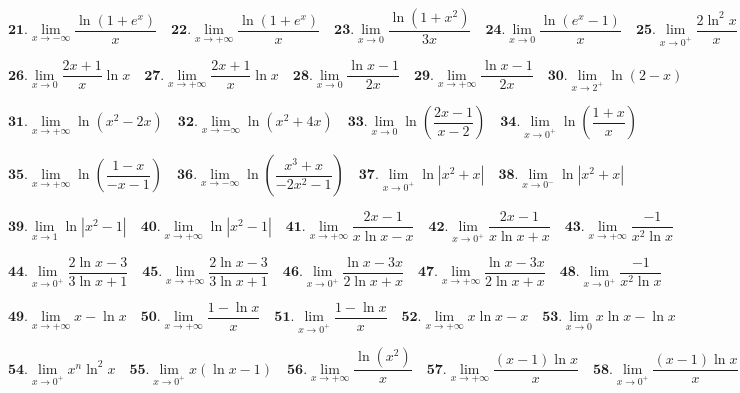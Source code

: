 \documentclass[12pt]{article}
\begin{document}
\[ 
\textbf{21.} \lim\limits_{x \to -\infty} \frac{\ln(1 + e^x)}{x} \quad
\textbf{22.} \lim\limits_{x \to +\infty} \frac{\ln(1 + e^x)}{x}  \quad
\textbf{23.} \lim\limits_{x \to 0} \frac{\ln(1 + x^2)}{3x} \quad
\textbf{24.} \lim\limits_{x \to 0} \frac{\ln(e^x - 1)}{x} \quad
\textbf{25.} \lim\limits_{x \to 0^+} \frac{2\ln^2 x}{x}
\] 

\[ 
\textbf{26.} \lim\limits_{x \to 0} \frac{2x + 1}{x} \ln x \quad
\textbf{27.} \lim\limits_{x \to +\infty} \frac{2x + 1}{x} \ln x  \quad
\textbf{28.} \lim\limits_{x \to 0} \frac{\ln x - 1}{2x} \quad
\textbf{29.} \lim\limits_{x \to +\infty} \frac{\ln x - 1}{2x} \quad
\textbf{30.} \lim\limits_{x \to 2^+} \ln(2 - x)
\]

\[ 
\textbf{31.} \lim\limits_{x \to +\infty} \ln(x^2 - 2x) \quad
\textbf{32.} \lim\limits_{x \to -\infty} \ln(x^2 + 4x) \quad
\textbf{33.} \lim\limits_{x \to 0} \ln\left(\frac{2x - 1}{x - 2}\right) \quad
\textbf{34.} \lim\limits_{x \to 0^+} \ln\left(\frac{1 + x}{x}\right)
\]

\[ 
\textbf{35.} \lim\limits_{x \to +\infty} \ln\left(\frac{1 - x}{-x - 1}\right) \quad
\textbf{36.} \lim\limits_{x \to -\infty} \ln\left(\frac{x^3 + x}{-2x^2 - 1}\right) \quad
\textbf{37.} \lim\limits_{x \to 0^+} \ln|x^2 + x| \quad
\textbf{38.} \lim\limits_{x \to 0^-} \ln|x^2 + x| 
\]

\[ 
\textbf{39.} \lim\limits_{x \to 1} \ln|x^2 - 1| \quad
\textbf{40.} \lim\limits_{x \to +\infty} \ln|x^2 - 1| \quad
\textbf{41.} \lim\limits_{x \to +\infty} \frac{2x - 1}{x \ln x - x} \quad
\textbf{42.} \lim\limits_{x \to 0^+} \frac{2x - 1}{x \ln x + x} \quad
\textbf{43.} \lim\limits_{x \to +\infty} \frac{-1}{x^2 \ln x} \quad
\]

\[ 
\textbf{44.} \lim\limits_{x \to 0^+} \frac{2\ln x - 3}{3\ln x + 1} \quad
\textbf{45.} \lim\limits_{x \to +\infty} \frac{2\ln x - 3}{3\ln x + 1} \quad
\textbf{46.} \lim\limits_{x \to 0^+} \frac{\ln x - 3x}{2\ln x + x} \quad
\textbf{47.} \lim\limits_{x \to +\infty} \frac{\ln x - 3x}{2\ln x + x} \quad
\textbf{48.} \lim\limits_{x \to 0^+} \frac{-1}{x^2 \ln x}
\]

\[
\textbf{49.} \lim\limits_{x \to +\infty} x - \ln x \quad
\textbf{50.} \lim\limits_{x \to +\infty} \frac{1 - \ln x}{x} \quad 
\textbf{51.} \lim\limits_{x \to 0^+} \frac{1 - \ln x}{x} \quad
\textbf{52.} \lim\limits_{x \to +\infty} x \ln x - x \quad 
\textbf{53.} \lim\limits_{x \to 0} x \ln x - \ln x
\]

\[
\textbf{54.} \lim\limits_{x \to 0^+} x^n \ln^2 x \quad 
\textbf{55.} \lim\limits_{x \to 0^+} x (\ln x - 1) \quad 
\textbf{56.} \lim\limits_{x \to +\infty} \frac{\ln(x^2)}{x} \quad
\textbf{57.} \lim\limits_{x \to +\infty} \frac{(x - 1) \ln x}{x} \quad 
\textbf{58.} \lim\limits_{x \to 0^+} \frac{(x - 1) \ln x}{x}
\]
\end{document}
